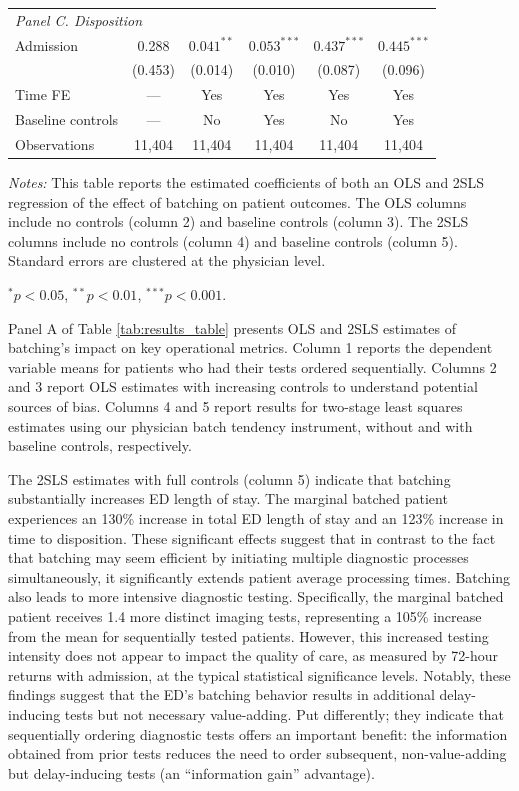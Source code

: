 \documentclass[,,nonblindrev]{informs}
\begin{document}
\begin{table}[ht]
\begin{threeparttable}
\begin{tabular}{lccccc}
\multicolumn{6}{l}{\textit{Panel C. Disposition}} \\[0.5em]
Admission & 0.288 & $0.041^{**}$ & $0.053^{***}$ & $0.437^{***}$ & $0.445^{***}$ \\
& (0.453) & (0.014) & (0.010) & (0.087) & (0.096) \\[0.5em]
\midrule
Time FE & --- & Yes & Yes & Yes & Yes \\
Baseline controls & --- & No & Yes & No & Yes \\
Observations & 11,404 & 11,404 & 11,404 & 11,404 & 11,404 \\
\bottomrule
\end{tabular}
\begin{tablenotes}
\footnotesize
\item \textit{Notes:} This table reports the estimated coefficients of both an OLS and 2SLS regression of the effect of batching on patient outcomes. The OLS columns include no controls (column 2) and baseline controls (column 3). The 2SLS columns include no controls (column 4) and baseline controls (column 5). Standard errors are clustered at the physician level.  
\item $^{*} p < 0.05$, $^{**} p < 0.01$, $^{***} p < 0.001$.
\end{tablenotes}
\end{threeparttable}
\end{table}

Panel A of Table \ref{tab:results_table} presents OLS and 2SLS estimates
of batching's impact on key operational metrics. Column 1 reports the
dependent variable means for patients who had their tests ordered
sequentially. Columns 2 and 3 report OLS estimates with increasing
controls to understand potential sources of bias. Columns 4 and 5 report
results for two-stage least squares estimates using our physician batch
tendency instrument, without and with baseline controls, respectively.

The 2SLS estimates with full controls (column 5) indicate that batching
substantially increases ED length of stay. The marginal batched patient
experiences an 130\% increase in total ED length of stay and an 123\%
increase in time to disposition. These significant effects suggest that
in contrast to the fact that batching may seem efficient by initiating
multiple diagnostic processes simultaneously, it significantly extends
patient average processing times. Batching also leads to more intensive
diagnostic testing. Specifically, the marginal batched patient receives
1.4 more distinct imaging tests, representing a 105\% increase from the
mean for sequentially tested patients. However, this increased testing
intensity does not appear to impact the quality of care, as measured by
72-hour returns with admission, at the typical statistical significance
levels. Notably, these findings suggest that the ED's batching behavior
results in additional delay-inducing tests but not necessary
value-adding. Put differently; they indicate that sequentially ordering
diagnostic tests offers an important benefit: the information obtained
from prior tests reduces the need to order subsequent, non-value-adding
but delay-inducing tests (an ``information gain'' advantage).
\end{document}
